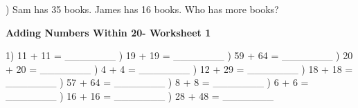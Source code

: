 \documentclass{article}%
\begin{document}
) Sam has 35 books. James has 16 books. Who has more books?%
\newline%
\newline%
\newline%
\pagebreak%
\large%
\begin{center}%
\textbf{Adding Numbers Within 20- Worksheet 1}%
\newline%
\end{center} \normalsize%
1) 11 + 11 = \_\_\_\_\_\_\_%
\newline%
\newline%
) 19 + 19 = \_\_\_\_\_\_\_%
\newline%
\newline%
) 59 + 64 = \_\_\_\_\_\_\_%
\newline%
\newline%
) 20 + 20 = \_\_\_\_\_\_\_%
\newline%
\newline%
) 4 + 4 = \_\_\_\_\_\_\_%
\newline%
\newline%
) 12 + 29 = \_\_\_\_\_\_\_%
\newline%
\newline%
) 18 + 18 = \_\_\_\_\_\_\_%
\newline%
\newline%
) 57 + 64 = \_\_\_\_\_\_\_%
\newline%
\newline%
) 8 + 8 = \_\_\_\_\_\_\_%
\newline%
\newline%
) 6 + 6 = \_\_\_\_\_\_\_%
\newline%
\newline%
) 16 + 16 = \_\_\_\_\_\_\_%
\newline%
\newline%
) 28 + 48 = \_\_\_\_\_\_\_%
\newline%
\newline%
\newline%
\end{document}
